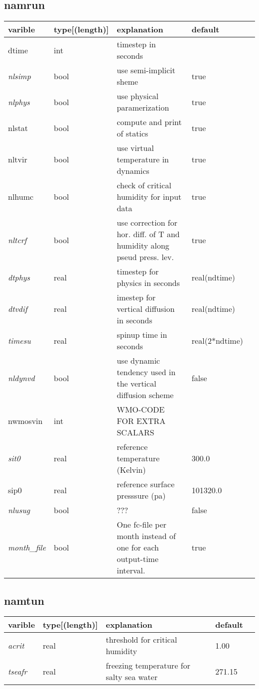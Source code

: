 \documentclass{article}
\begin{document}
\subsection{namrun}
\begin{tabular}{|l|l|p{5cm}|l|l|}
  \hline
  varible & type[(length)] & explanation & default\\
  \hline
  \hline
  dtime & int &   timestep in seconds & \\
  \emph{nlsimp} & bool & use semi-implicit sheme & true \\
  \emph{nlphys} & bool & use physical paramerization & true \\
  nlstat & bool &  compute and print of statics  & true \\
  nltvir & bool & use virtual temperature in dynamics & true \\
  nlhumc & bool & check of critical humidity for input data & true \\
  \emph{nltcrf} & bool & use correction for hor. diff. of T and humidity along pseud press. lev.  & true \\
  \emph{dtphys} & real & timestep for physics in seconds    & real(ndtime) \\
  \emph{dtvdif} & real & imestep for vertical diffusion in seconds & real(ndtime)  \\
  \emph{timesu} & real & spinup time in seconds &  real(2*ndtime) \\
  \emph{nldynvd} & bool & use dynamic tendency used in the vertical diffusion scheme  & false \\
  nwmosvin &  int &  WMO-CODE FOR EXTRA SCALARS & \\
  \emph{sit0} & real & reference temperature (Kelvin)  & 300.0 \\
  sip0 & real & reference surface presssure (pa)  & 101320.0 \\
  \emph{nlusug} &  bool &   ??? & false \\
  \emph{month\_file} & bool & One fc-file per month instead of one for each output-time interval. & true \\
  \hline
\end{tabular}



\subsection{namtun}
\begin{tabular}{|l|l|l|l|l|}
  \hline
  varible & type[(length)] & explanation & default\\
  \hline
  \hline
  \emph{acrit}   & real &   threshold for critical humidity & 1.00 \\
  \emph{tseafr}  & real &   freezing temperature for salty sea water & 271.15 \\
 \hline
\end{tabular}
\end{document}
